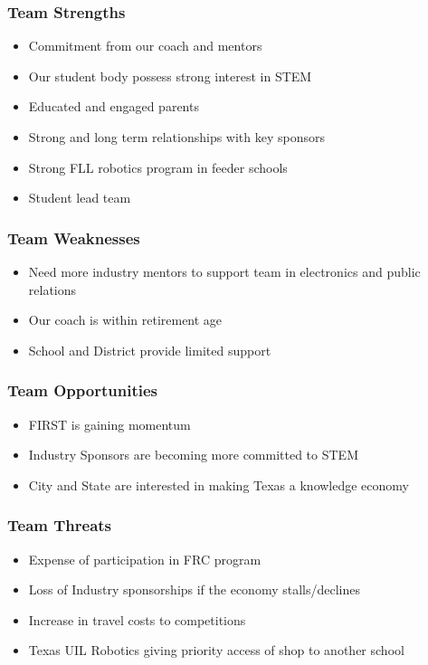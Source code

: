\subsubsection{Team Strengths}
\begin{itemize}
	\item Commitment from our coach and mentors
	\item Our student body possess strong interest in STEM
	\item Educated and engaged parents
	\item Strong and long term relationships with key sponsors
	\item Strong FLL robotics program in feeder schools
	\item Student lead team
\end{itemize}

\subsubsection{Team Weaknesses}
\begin{itemize}
	\item Need more industry mentors to support team in electronics and public relations
	\item Our coach is within retirement age
	\item School and District provide limited support
\end{itemize}

\subsubsection{Team Opportunities}
\begin{itemize}
	\item FIRST is gaining momentum
	\item Industry Sponsors are becoming more committed to STEM
	\item City and State are interested in making Texas a knowledge economy
\end{itemize}

\subsubsection{Team Threats}
\begin{itemize}
	\item Expense of participation in FRC program
	\item Loss of Industry sponsorships if the economy stalls/declines 
	\item Increase in travel costs to competitions
	\item Texas UIL Robotics giving priority access of shop to another school
\end{itemize}

